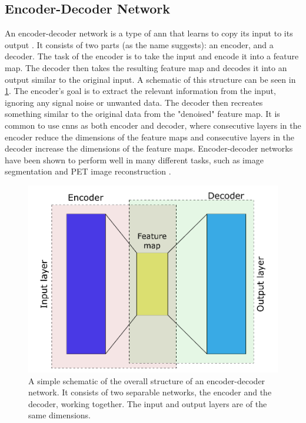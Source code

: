 \subsection{Encoder-Decoder Network}
\label{sec:ml:types:encoderdecoder}
An encoder-decoder network is a type of \acrshort{ann} that learns to copy its input to its output \cite{https://doi.org/10.1002/aic.690370209}. It consists of two parts (as the name suggests): an encoder, and a decoder. The task of the encoder is to take the input and encode it into a feature map. The decoder then takes the resulting feature map and decodes it into an output similar to the original input. A schematic of this structure can be seen in \cref{fig:encoderdecoder}. The encoder's goal is to extract the relevant information from the input, ignoring any signal noise or unwanted data. The decoder then recreates something similar to the original data from the "denoised" feature map. It is common to use \acrshort{cnn}s as both encoder and decoder, where consecutive layers in the encoder reduce the dimensions of the feature maps and consecutive layers in the decoder increase the dimensions of the feature maps. Encoder-decoder networks have been shown to perform well in many different tasks, such as image segmentation \cite{7803544} and PET image reconstruction \cite{HAGGSTROM2019253}.  

\begin{figure}[htbp]  
    \centering
    \includegraphics[width=.7\textwidth]{figures/encoderdecoder.pdf}
    \caption[Encoder-decoder network]{A simple schematic of the overall structure of an encoder-decoder network. It consists of two separable networks, the encoder and the decoder, working together. The input and output layers are of the same dimensions. }
    \label{fig:encoderdecoder}
\end{figure}

